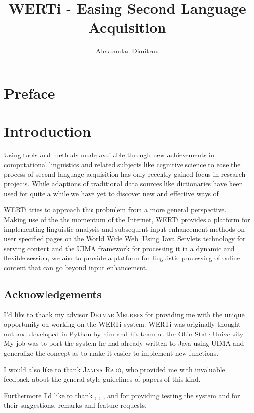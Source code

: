 \documentclass{article}
\author{Aleksandar Dimitrov}
\title{WERTi - Easing Second Language Acquisition}
\begin{document}
\maketitle

\tableofcontents

\section*{Preface}

\section{Introduction}

Using tools and methods made available through new achievements in computational
linguistics and related subjects like cognitive science to ease the process of
second language acquisition has only recently gained focus in research projects.
While adaptions of traditional data sources like dictionaries have been used for
quite a while we have yet to discover new and effective ways of 

WERTi tries to approach this probmlem from a more general perspective. Making
use of the the momentum of the Internet, WERTi provides a platform for
implementing linguistic analysis and subsequent input enhancement methods on
user specified pages on the World Wide Web. Using Java Servlets technology for
serving content and the UIMA framework for processing it in a dynamic and
flexible session, we aim to provide a platform for linguistic processing of
online content that can go beyond input enhancement.

\subsection{Acknowledgements}

I'd like to thank my advisor \textsc{Detmar Meurers} for providing me with the
unique opportunity on working on the WERTi system. WERTi was originally thought
out and developed in Python by him and his team at the Ohio State University. My
job was to port the system he had already written to Java using UIMA and
generalize the concept as to make it easier to implement new functions.

I would also like to thank \textsc{Janina Radó}, who provided me with invaluable feedback
about the general style guidelines of papers of this kind.

Furthermore I'd like to thank , , , and for providing testing the system and for
their suggestions, remarks and feature requests.
\end{document}
